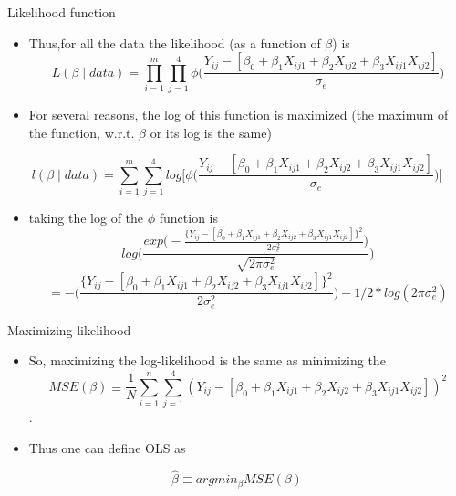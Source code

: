 \documentclass[ignorenonframetext,]{beamer}
\providecommand{\tightlist}{%
  \setlength{\itemsep}{0pt}\setlength{\parskip}{0pt}}
\begin{document}
\begin{frame}{Likelihood function}

\begin{itemize}
\item
  Thus,for all the data the likelihood (as a function of \(\beta\)) is
  \[ L(\beta \mid data) = \prod_{i=1}^m \prod_{j=1}^4  \phi \Big(\frac{Y_{ij}-[\beta_0 +\beta_1 X_{ij1}+\beta_2 X_{ij2} + \beta_3 X_{ij1}X_{ij2}]}{\sigma_e}\Big)\]
\item
  For several reasons, the log of this function is maximized (the
  maximum of the function, w.r.t. \(\beta\) or its log is the same)
\end{itemize}

\[ l(\beta \mid data) = \sum_{i=1}^m \sum_{j=1}^4 log \Big[ \phi \Big(\frac{Y_{ij}-[\beta_0 +\beta_1 X_{ij1}+\beta_2 X_{ij2} + \beta_3 X_{ij1}X_{ij2}]}{\sigma_e}\Big) \Big] \]

\begin{itemize}
\tightlist
\item
  taking the log of the \(\phi\) function is
  \[ log \Bigg( \frac{exp \Big(- \frac{\{Y_{ij}-[\beta_0 +\beta_1 X_{ij1}+\beta_2 X_{ij2} + 
  \beta_3 X_{ij1}X_{ij2}] \}^2}{2\sigma^2_e}\Big)}{\sqrt{2 \pi \sigma^2_e} } \Bigg) \]
  \[ = -\Big(  \frac{ \{Y_{ij}-[\beta_0 +\beta_1 X_{ij1}+\beta_2 X_{ij2} + \beta_3 X_{ij1}X_{ij2}]\}^2}{2 \sigma^2_e}\Big) - 1/2 * log(2 \pi \sigma^2_e)\]
\end{itemize}

\end{frame}

\begin{frame}{Maximizing likelihood}

\begin{itemize}
\item
  So, maximizing the log-likelihood is the same as minimizing the
  \[MSE(\beta) \equiv \frac{1}{N} \sum_{i=1}^n \sum_{j=1}^4(Y_{ij}-[\beta_0 +\beta_1 X_{ij1}+\beta_2 X_{ij2} + \beta_3 X_{ij1}X_{ij2}]) ^2 \].
\item
  Thus one can define OLS as
\end{itemize}

\[ \hat{\beta} \equiv argmin_{\beta} MSE(\beta) \]

\end{frame}
\end{document}
